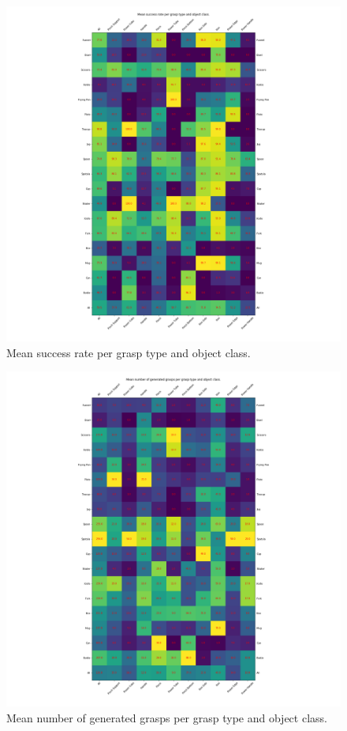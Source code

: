 \begin{figure}
\centering
\includegraphics[width=0.8\columnwidth]{images/post-analysis/mean_success_rate_per_grasp_type_and_object_class.png}
\caption{Mean success rate per grasp type and object class.}
\label{fig:post12}
\end{figure}

\begin{figure}
\centering
\includegraphics[width=0.8\columnwidth]{images/post-analysis/mean_number_of_generated_grasps_per_grasp_type_and_object_class.png}
\caption{Mean number of generated grasps per grasp type and object class.}
\label{fig:post13}
\end{figure}


